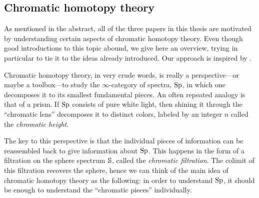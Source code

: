 

\subsection{Chromatic homotopy theory}
\label{ch0:ssec:chromatic-homotopy-theory}

As mentioned in the abstract, all of the three papers in this thesis are motivated by understanding certain aspects of chromatic homotopy theory. Even though good introductions to this topic abound, we give here an overview, trying in particular to tie it to the ideas already introduced. Our approach is inspired by \cite{barthel-beaudry_19}. 

Chromatic homotopy theory, in very crude words, is really a perspective---or maybe a toolbox---to study the $\infty$-category of spectra, $\Sp$, in which one decomposes it to its smallest fundamental pieces. An often repeated analogy is that of a prism. If $\Sp$ consists of pure white light, then shining it through the ``chromatic lens'' decomposes it to distinct colors, labeled by an integer $n$ called the \emph{chromatic height}. 

\begin{center}
\end{center}

The key to this perspective is that the individual pieces of information can be reassembled back to give information about $\Sp$. This happens in the form of a filtration on the sphere spectrum $\S$, called the \emph{chromatic filtration}. The colimit of this filtration recovers the sphere, hence we can think of the main idea of chromatic homotopy theory as the following: in order to understand $\Sp$, it should be enough to understand the ``chromatic pieces'' individually. 

